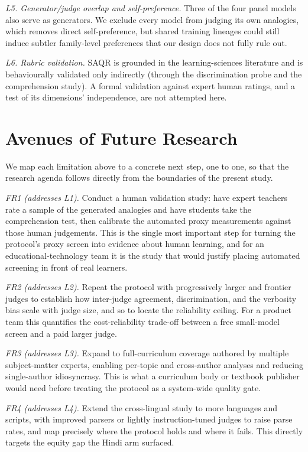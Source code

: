 \documentclass[11pt]{article}
\begin{document}
\emph{L5. Generator/judge overlap and self-preference.} Three of the four panel models also serve as
generators. We exclude every model from judging its own analogies, which removes direct
self-preference, but shared training lineages could still induce subtler family-level preferences that
our design does not fully rule out.

\emph{L6. Rubric validation.} SAQR is grounded in the learning-sciences literature and is
behaviourally validated only indirectly (through the discrimination probe and the comprehension
study). A formal validation against expert human ratings, and a test of its dimensions' independence,
are not attempted here.

\section{Avenues of Future Research}
\label{sec:future}
We map each limitation above to a concrete next step, one to one, so that the research agenda follows
directly from the boundaries of the present study.

\emph{FR1 (addresses L1).} Conduct a human validation study: have expert teachers rate a sample of the
generated analogies and have students take the comprehension test, then calibrate the automated proxy
measurements against those human judgements. This is the single most important step for turning the
protocol's proxy screen into evidence about human learning, and for an educational-technology team it
is the study that would justify placing automated screening in front of real learners.

\emph{FR2 (addresses L2).} Repeat the protocol with progressively larger and frontier judges to
establish how inter-judge agreement, discrimination, and the verbosity bias scale with judge size, and
so to locate the reliability ceiling. For a product team this quantifies the cost-reliability
trade-off between a free small-model screen and a paid larger judge.

\emph{FR3 (addresses L3).} Expand to full-curriculum coverage authored by multiple subject-matter
experts, enabling per-topic and cross-author analyses and reducing single-author idiosyncrasy. This is
what a curriculum body or textbook publisher would need before treating the protocol as a system-wide
quality gate.

\emph{FR4 (addresses L4).} Extend the cross-lingual study to more languages and scripts, with improved
parsers or lightly instruction-tuned judges to raise parse rates, and map precisely where the protocol
holds and where it fails. This directly targets the equity gap the Hindi arm surfaced.
\end{document}
